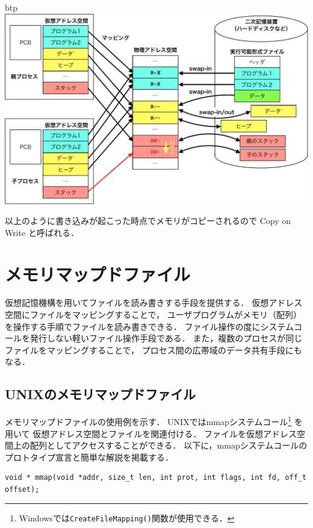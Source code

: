 \begin{description}
\begin{myfig}{btp}
    \includegraphics[scale=0.66]{Fig/virtualMemoryCOW-crop.pdf}
  \end{myfig}
\end{description}

以上のように書き込みが起こった時点でメモリがコピーされるので
Copy on Write と呼ばれる．

\section{メモリマップドファイル}
仮想記憶機構を用いてファイルを読み書きする手段を提供する．
仮想アドレス空間にファイルをマッピングすることで，
ユーザプログラムがメモリ（配列）を操作する手順でファイルを読み書きできる．
ファイル操作の度にシステムコールを発行しない軽いファイル操作手段である．
また，複数のプロセスが同じファイルをマッピングすることで，
プロセス間の広帯域のデータ共有手段にもなる．

\subsection{UNIXのメモリマップドファイル}
メモリマップドファイルの使用例を示す．
UNIXではmmapシステムコール\footnote{
Windowsでは\texttt{CreateFileMapping()}関数が使用できる．} を用いて
仮想アドレス空間とファイルを関連付ける．
ファイルを仮想アドレス空間上の配列としてアクセスすることができる．
以下に，mmapシステムコールのプロトタイプ宣言と簡単な解説を掲載する．

\begin{lstlisting}[numbers=none]
void * mmap(void *addr, size_t len, int prot, int flags, int fd, off_t offset);
\end{lstlisting}

